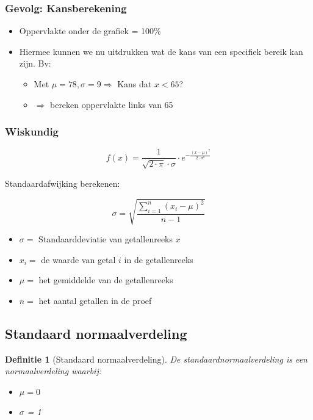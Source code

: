 \documentclass{article}
\newtheorem{theorem}{Definitie}[section]
\begin{document}
\subsubsection{Gevolg: Kansberekening}

\begin{itemize}
    \item Oppervlakte onder de grafiek = 100\%
    \item Hiermee kunnen we nu uitdrukken wat de kans van een specifiek bereik kan zijn. Bv:
    \begin{itemize}
        \item Met $\mu = 78, \sigma = 9 \Rightarrow $ Kans dat $x < 65$? 
        \item $\Rightarrow$ bereken oppervlakte links van 65
    \end{itemize}
\end{itemize}

\subsubsection{Wiskundig}

\begin{equation}
f(x) = \frac{1}{\sqrt{2\cdot\pi}\cdot \sigma}\cdot e^{-\frac{(x - \mu)^2}{2\cdot\sigma^2}}
\end{equation}

Standaardafwijking berekenen:

\begin{equation}
    \sigma = \sqrt{\frac{\sum_{i=1}^n (x_i - \mu)^2}{n - 1}}
\end{equation}

\begin{itemize}
    \item $\sigma =$ Standaarddeviatie van getallenreeks $x$
    \item $x_i =$ de waarde van getal $i$ in de getallenreeks
    \item $\mu =$ het gemiddelde van de getallenreeks
    \item $n =$ het aantal getallen in de proef
\end{itemize}

\subsection{Standaard normaalverdeling}

\begin{theorem}[Standaard normaalverdeling]
    De standaardnormaalverdeling is een normaalverdeling waarbij:
    
    \begin{itemize}
        \item $\mu = 0$
        \item $\sigma$ = 1
    \end{itemize}
\end{theorem}
\end{document}
